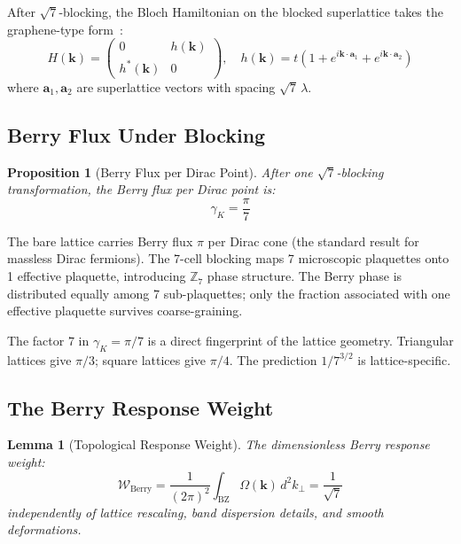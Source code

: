 \documentclass[12pt,a4paper]{article}
\theoremstyle{plain}
\newtheorem{proposition}[theorem]{Proposition}
\newtheorem{lemma}[theorem]{Lemma}
\theoremstyle{definition}
\newcommand{\BZ}{\mathrm{BZ}}
\newcommand{\Wberry}{\mathcal{W}_{\mathrm{Berry}}}
\begin{document}
After $\sqrt{7}$-blocking, the Bloch Hamiltonian on the blocked superlattice takes the graphene-type form~\cite{Berry1984}:
\begin{equation}
H(\mathbf{k}) = \begin{pmatrix} 0 & h(\mathbf{k}) \\ h^*(\mathbf{k}) & 0 \end{pmatrix}, \quad
h(\mathbf{k}) = t\left(1 + e^{i\mathbf{k}\cdot\mathbf{a}_1} + e^{i\mathbf{k}\cdot\mathbf{a}_2}\right)
\end{equation}
where $\mathbf{a}_1, \mathbf{a}_2$ are superlattice vectors with spacing $\sqrt{7}\,\lambda$.

\subsection{Berry Flux Under Blocking}

\begin{proposition}[Berry Flux per Dirac Point]\label{prop:berry-flux}
After one $\sqrt{7}$-blocking transformation, the Berry flux per Dirac point is:
\begin{equation}
\gamma_K = \frac{\pi}{7}
\end{equation}
\end{proposition}

The bare lattice carries Berry flux $\pi$ per Dirac cone (the standard result for massless Dirac fermions). The 7-cell blocking maps 7 microscopic plaquettes onto 1 effective plaquette, introducing $\mathbb{Z}_7$ phase structure. The Berry phase is distributed equally among 7 sub-plaquettes; only the fraction associated with one effective plaquette survives coarse-graining.

The factor $7$ in $\gamma_K = \pi/7$ is a direct fingerprint of the lattice geometry. Triangular lattices give $\pi/3$; square lattices give $\pi/4$. The prediction $1/7^{3/2}$ is lattice-specific.

\subsection{The Berry Response Weight}

\begin{lemma}[Topological Response Weight]\label{lem:berry-weight}
The dimensionless Berry response weight:
\begin{equation}
\Wberry = \frac{1}{(2\pi)^2}\int_{\BZ} \Omega(\mathbf{k})\,d^2k_\perp = \frac{1}{\sqrt{7}}
\end{equation}
independently of lattice rescaling, band dispersion details, and smooth deformations.
\end{lemma}
\end{document}
